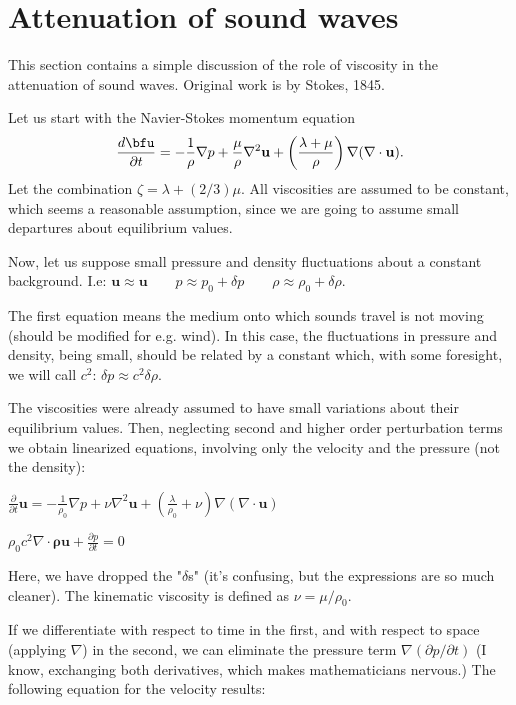 \section{Attenuation of sound waves}

This section contains a simple discussion of the role of viscosity in
the attenuation of sound waves. Original work is by Stokes, 1845.

Let us start with the Navier-Stokes momentum equation
\[
\frac{d \bfu }{\partial t}=
- \frac{1}{\rho} \nabla p +
\frac{\mu}{\rho} \nabla^2 \mathbf{u} +
\left(\frac{\lambda+\mu}{\rho}\right) \nabla (\nabla\cdot\mathbf{u}).
\]
Let the combination $ \zeta = \lambda + (2/3) \mu$.
%
All viscosities are assumed to be constant, which seems a reasonable
 assumption, since we are going to assume small departures about
 equilibrium values.


Now, let us suppose small pressure and density fluctuations about a constant background. I.e:
$ \mathbf{u} \approx \mathbf{u} \qquad p\approx p_0+\delta p \qquad \rho\approx \rho_0+\delta \rho .$

The first equation means the medium onto which sounds travel is not moving (should be modified for e.g. wind). In this case, the fluctuations in pressure and density, being small, should be related by a constant which, with some foresight, we will call $ c^2$:
$ \delta p \approx c^2 \delta \rho .$

The viscosities were already assumed to have small variations about their equilibrium values. Then, neglecting second and higher order perturbation terms we obtain linearized equations, involving only the velocity and the pressure (not the density):

$ \frac{\partial }{\partial t} \mathbf{u} = - \frac{1}{\rho_0} \nabla p + \nu \nabla^2 \mathbf{u} + \left(\frac{\lambda}{\rho_0}+\nu\right) \nabla (\nabla\cdot\mathbf{u})  $

$ \rho_0 c^2 \nabla \cdot \mathbf{\rho u} + \frac{\partial p}{\partial t} =0 $

Here, we have dropped the "$ \delta$s" (it's confusing, but the expressions are so much cleaner). The kinematic viscosity is defined as $ \nu=\mu/\rho_0$.

If we differentiate with respect to time in the first, and with respect to space (applying $ \nabla$) in the second, we can eliminate the pressure term $ \nabla(\partial p/\partial t)$ (I know, exchanging both derivatives, which makes mathematicians nervous.) The following equation for the velocity results:

